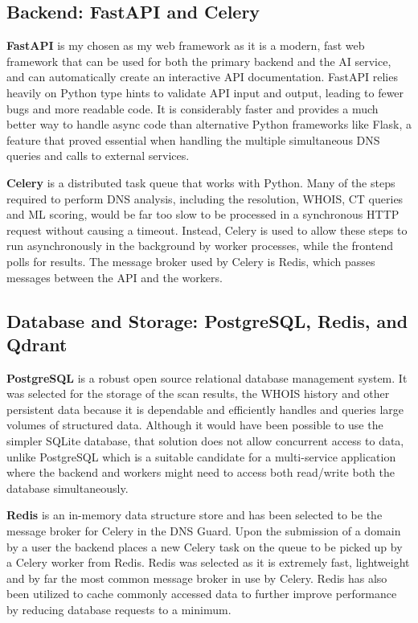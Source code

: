 \documentclass[12pt, a4paper, oneside]{report}
\begin{document}
\subsection{Backend: FastAPI and Celery}

\textbf{FastAPI} \cite{fastapi2024} is my chosen as my web framework as it is a modern, fast web framework that can be used for both the primary backend and the AI service, and can automatically create an interactive API documentation. FastAPI relies heavily on Python type hints to validate API input and output, leading to fewer bugs and more readable code. It is considerably faster and provides a much better way to handle async code than alternative Python frameworks like Flask, a feature that proved essential when handling the multiple simultaneous DNS queries and calls to external services.

\textbf{Celery} \cite{celery2024} is a distributed task queue that works with Python. Many of the steps required to perform DNS analysis, including the resolution, WHOIS, CT queries and ML scoring, would be far too slow to be processed in a synchronous HTTP request without causing a timeout. Instead, Celery is used to allow these steps to run asynchronously in the background by worker processes, while the frontend polls for results. The message broker used by Celery is Redis, which passes messages between the API and the workers.

\subsection{Database and Storage: PostgreSQL, Redis, and Qdrant}

\textbf{PostgreSQL} \cite{postgresql2024} is a robust open source relational database management system. It was selected for the storage of the scan results, the WHOIS history and other persistent data because it is dependable and efficiently handles and queries large volumes of structured data. Although it would have been possible to use the simpler SQLite database, that solution does not allow concurrent access to data, unlike PostgreSQL which is a suitable candidate for a multi-service application where the backend and workers might need to access both read/write both the database simultaneously.

\textbf{Redis} \cite{redis2024} is an in-memory data structure store and has been selected to be the message broker for Celery in the DNS Guard. Upon the submission of a domain by a user the backend places a new Celery task on the queue to be picked up by a Celery worker from Redis. Redis was selected as it is extremely fast, lightweight and by far the most common message broker in use by Celery. Redis has also been utilized to cache commonly accessed data to further improve performance by reducing database requests to a minimum.
\end{document}
